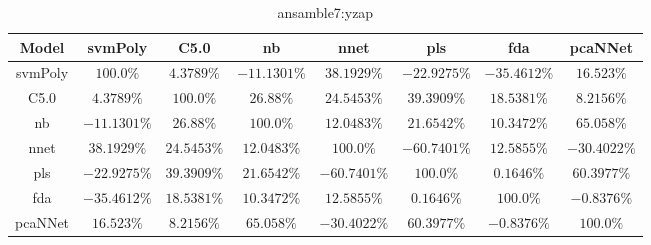 \begin{table}[!ht]
	\centering
	\begin{tabular}{|c|c|c|c|c|c|c|c|}
		\hline
		Model & svmPoly & C5.0 & nb & nnet & pls & fda & pcaNNet \\ \hline
		svmPoly & $100.0\%$ & $4.3789\%$ & $-11.1301\%$ & $38.1929\%$ & $-22.9275\%$ & $-35.4612\%$ & $16.523\%$ \\ \hline
		C5.0 & $4.3789\%$ & $100.0\%$ & $26.88\%$ & $24.5453\%$ & $39.3909\%$ & $18.5381\%$ & $8.2156\%$ \\ \hline
		nb & $-11.1301\%$ & $26.88\%$ & $100.0\%$ & $12.0483\%$ & $21.6542\%$ & $10.3472\%$ & $65.058\%$ \\ \hline
		nnet & $38.1929\%$ & $24.5453\%$ & $12.0483\%$ & $100.0\%$ & $-60.7401\%$ & $12.5855\%$ & $-30.4022\%$ \\ \hline
		pls & $-22.9275\%$ & $39.3909\%$ & $21.6542\%$ & $-60.7401\%$ & $100.0\%$ & $0.1646\%$ & $60.3977\%$ \\ \hline
		fda & $-35.4612\%$ & $18.5381\%$ & $10.3472\%$ & $12.5855\%$ & $0.1646\%$ & $100.0\%$ & $-0.8376\%$ \\ \hline
		pcaNNet & $16.523\%$ & $8.2156\%$ & $65.058\%$ & $-30.4022\%$ & $60.3977\%$ & $-0.8376\%$ & $100.0\%$ \\ \hline
	\end{tabular}
	\caption{ansamble7:yzap}
	\label{tab:ansamble7:yzap}
\end{table}
